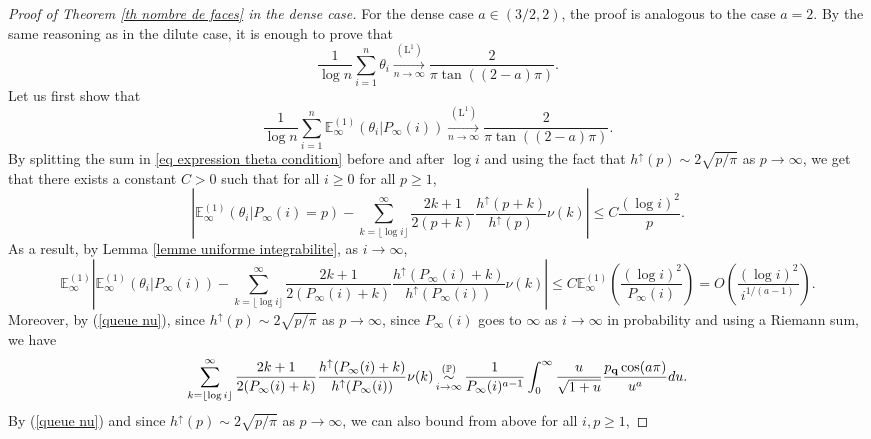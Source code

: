 \documentclass[11pt]{article}
\numberwithin{equation}{section}
\def\E{\mathbb{E}}
\def\P{\mathbb{P}}
\begin{document}
\begin{proof}[Proof of Theorem \ref{th nombre de faces} in the dense case]
For the dense case $a \in (3/2,2)$, the proof is analogous to the case $a=2$. By the same reasoning as in the dilute case, it is enough to prove that
\begin{equation}\label{eq cv theta critique dense}
	\frac{1}{\log n}\sum_{i=1}^n \theta_i
	\mathop{\longrightarrow}\limits_{n\to \infty}^{(\mathrm{L}^1)}
	\frac{2}{\pi \tan((2-a) \pi)}.
\end{equation}
Let us first show that
\begin{equation}\label{eq cv theta dense condition}
	\frac{1}{\log n}\sum_{i=1}^n \E^{(1)}_\infty(\theta_i \vert P_\infty(i))
	\mathop{\longrightarrow}\limits_{n\to \infty}^{(\mathrm{L}^1)}
	\frac{2}{\pi \tan((2-a) \pi)}.
\end{equation}
By splitting the sum in \eqref{eq expression theta condition} before and after $\log i$ and using the fact that $h^\uparrow(p) \sim 2\sqrt{p/\pi}$ as $p \to \infty$, we get that there exists a constant $C>0$ such that for all $i \ge0$ for all $p\ge 1$,
$$
\left\vert
\E^{(1)}_\infty(\theta_i \vert P_\infty(i)=p) -
 \sum_{k=\lfloor \log i \rfloor}^\infty
\frac{2k+1}{2(p+k)} \frac{h^\uparrow(p+k)}{h^\uparrow(p)} \nu(k)
\right\vert
\le  C \frac{(\log i )^2}{p}.
$$
As a result, by Lemma \ref{lemme uniforme integrabilite}, as $i \to \infty$, 
\begin{equation}\label{eq reste esperance conditionelle theta}
\E^{(1)}_\infty
\left\vert
\E^{(1)}_\infty(\theta_i \vert P_\infty(i)) -
\sum_{k=\lfloor \log i \rfloor}^\infty
\frac{2k+1}{2(P_\infty(i)+k)} \frac{h^\uparrow(P_\infty(i)+k)}{h^\uparrow(P_\infty(i))} \nu(k)
\right\vert
\le  C \E^{(1)}_\infty \left( \frac{(\log i )^2}{P_\infty(i)}
\right)
= O\left(
\frac{(\log i )^2}{i^{1/(a-1)}}
\right).
\end{equation}
Moreover, by (\ref{queue nu}), since $h^\uparrow(p) \sim 2\sqrt{p/\pi}$ as $p\to \infty$, since $P_\infty(i)$ goes to $\infty$ as $i \to \infty$ in probability and using a Riemann sum, we have 
\begin{equation}\label{equivalent esperance conditionnelle theta dense}
\sum_{k=\lfloor \log i \rfloor}^\infty
\frac{2k+1}{2(P_\infty(i)+k)} \frac{h^\uparrow(P_\infty(i)+k)}{h^\uparrow(P_\infty(i))} \nu(k)
\mathop{\sim}\limits_{i \to \infty}^{(\P)}
\frac{1}{P_\infty(i)^{a-1}} \int_{0}^\infty \frac{u}{\sqrt{1+u}} \frac{p_{\bf q} \cos(a \pi)}{ u^a} du.
\end{equation}
By (\ref{queue nu}) and since $h^\uparrow(p) \sim 2\sqrt{p/\pi}$ as $p\to \infty$, we can also {bound from above} for all $i,p\ge 1$,

\end{proof}
\end{document}
